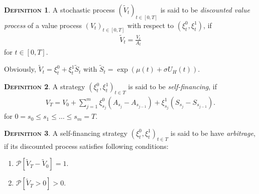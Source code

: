 \documentclass[a4paper, twoside, 11pt]{article}
\theoremstyle{definition}
\newtheorem{definition}{\scshape Definition}[section]
\begin{document}
  \begin{definition}
	A stochastic process $(\tilde{V}_t)_{t\in[0,T]}$ is said to be \emph{discounted value process} of a value process $(V_t)_{t\in [0, T]}$ with respect to $(\xi_t^0, \xi_t^1)$, if 
	\begin{eqnarray*}
	  \tilde{V}_t = \frac{V_t}{A_t}
	\end{eqnarray*}
	for $t \in [0, T]$.
  \end{definition}
  Obviously, $\tilde{V}_t = \xi^0_t + \xi^1_t \tilde{S}_t$ with $\tilde{S}_t=\exp(\mu(t) + \sigma U_H(t))$.
  \begin{definition}
	A strategy $(\xi^0_t, \xi^1_t)_{t\in T}$ is said to be \emph{self-financing}, if
	\begin{eqnarray}
	  V_T = V_0 + \sum_{j=1}^{m} \xi^0_{s_j} (A_{s_{j}} - A_{s_{j-1}}) + \xi^1_{s_j} (S_{s_{j}} - S_{s_{j-1}}). 
	  \label{sec:123}
	\end{eqnarray}
	\label{sec:def}
	for $0=s_0\le s_1\le \dots\le s_m=T$.
  \end{definition}

  \begin{definition}
	A self-financing strategy $(\xi^0_t, \xi^1_t)_{t\in T}$ is said to be have \emph{arbitrage}, if its discounted process satisfies following conditions:
	\begin{enumerate}[topsep=0pt, itemsep=-1ex, partopsep=1ex, parsep=1ex, label=(\roman*)]
	  \item $\mathcal{P}[\tilde{V}_T - \tilde{V}_0]=1$.
	  \item $\mathcal{P}[\tilde{V}_T > 0] > 0$.
	  \end{enumerate}
	\end{definition}
\end{document}
